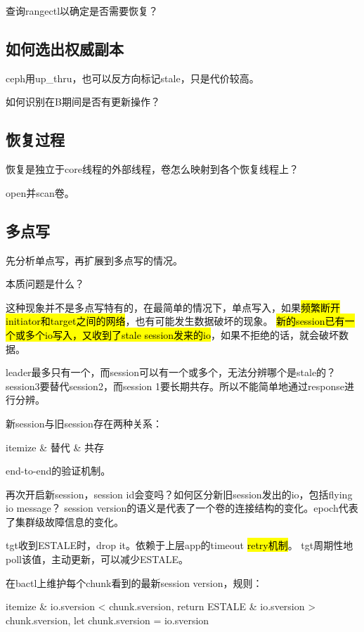 查询rangectl以确定是否需要恢复？

\subsection{如何选出权威副本}


ceph用up\_thru，也可以反方向标记stale，只是代价较高。

如何识别在B期间是否有更新操作？

\subsection{恢复过程}

恢复是独立于core线程的外部线程，卷怎么映射到各个恢复线程上？

open并scan卷。

\subsection{多点写}


先分析单点写，再扩展到多点写的情况。

本质问题是什么？

这种现象并不是多点写特有的，在最简单的情况下，单点写入，如果\hl{频繁断开initiator和target之间的网络}，也有可能发生数据破坏的现象。
\hl{新的session已有一个或多个io写入，又收到了stale session发来的io}，如果不拒绝的话，就会破坏数据。

leader最多只有一个，而session可以有一个或多个，无法分辨哪个是stale的？
session3要替代session2，而session 1要长期共存。所以不能简单地通过response进行分辨。

新session与旧session存在两种关系：
\begin{myeasylist}{itemize}
& 替代
& 共存
\end{myeasylist}

end-to-end的验证机制。

再次开启新session，session id会变吗？如何区分新旧session发出的io，包括flying io message？
session version的语义是代表了一个卷的连接结构的变化。epoch代表了集群级故障信息的变化。

tgt收到ESTALE时，drop it。依赖于上层app的timeout \hl{retry机制}。
tgt周期性地poll该值，主动更新，可以减少ESTALE。

在bactl上维护每个chunk看到的最新session version，规则：
\begin{myeasylist}{itemize}
& io.sversion < chunk.sversion, return ESTALE
& io.sversion > chunk.sversion, let chunk.sversion = io.sversion
\end{myeasylist}


